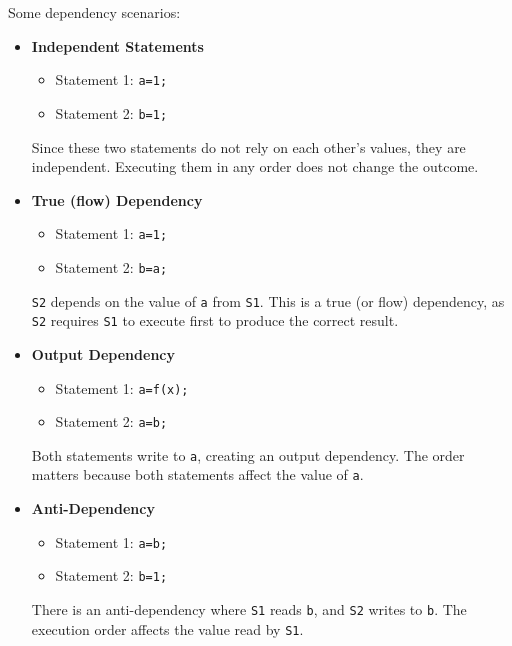 \highspace
\begin{examplebox}[: Dependencies]
    Some dependency scenarios:
    \begin{itemize}
        \item \textbf{Independent Statements}
        \begin{itemize}
            \item Statement 1: \texttt{a=1;}
            \item Statement 2: \texttt{b=1;}
        \end{itemize}
        Since these two statements do not rely on each other's values, they are independent. Executing them in any order does not change the outcome.

        \newpage

        \item \textbf{True (flow) Dependency}
        \begin{itemize}
            \item Statement 1: \texttt{a=1;}
            \item Statement 2: \texttt{b=a;}
        \end{itemize}
        \texttt{S2} depends on the value of \texttt{a} from \texttt{S1}. This is a true (or flow) dependency, as \texttt{S2} requires \texttt{S1} to execute first to produce the correct result.

        \item \textbf{Output Dependency}
        \begin{itemize}
            \item Statement 1: \texttt{a=f(x);}
            \item Statement 2: \texttt{a=b;}
        \end{itemize}
        Both statements write to \texttt{a}, creating an output dependency. The order matters because both statements affect the value of \texttt{a}.
        
        \item \textbf{Anti-Dependency}
        \begin{itemize}
            \item Statement 1: \texttt{a=b;}
            \item Statement 2: \texttt{b=1;}
        \end{itemize}
        There is an anti-dependency where \texttt{S1} reads \texttt{b}, and \texttt{S2} writes to \texttt{b}. The execution order affects the value read by \texttt{S1}.
    \end{itemize}
\end{examplebox}

